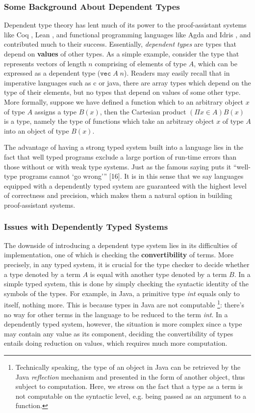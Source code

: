\documentclass{article}
\theoremstyle{remark}
\begin{document}
\subsubsection{Some Background About Dependent Types}
Dependent type theory has lent much of its power to the proof-assistant systems like Coq \cite{huet1997coq}, Lean \cite{de2015lean}, and functional programming languages like Agda \cite{norell2008dependently} and Idris \cite{brady2013idris}, and contributed much to their success. Essentially, \emph{dependent types} are types that depend on \textbf{values} of other types. As a simple example, consider the type that represents vectors of length $n$ comprising of elements of type $A$, which can be expressed as a dependent type ($\texttt{vec}\; A\; n$). Readers may easily recall that in imperative languages such as c or java, there are array types which depend on the type of their elements, but no types that depend on values of some other type. More formally, suppose we have defined a function which to an arbitrary object $x$ of type $A$ assigns a type $B(x)$, then the Cartesian product $(\Pi x \in A)B(x)$ is a type, namely the type of functions which take an arbitrary object $x$ of type $A$ into an object of type $B(x)$.

The advantage of having a strong typed system built into a language lies in the fact that well typed programs exclude a large portion of run-time errors than those without or with weak type systems. Just as the famous saying puts it “well-type programs cannot ‘go wrong’” [16]. It is in this sense that we say languages equipped with a dependently typed system are guaranteed with the highest level of correctness and precision, which makes them a natural option in building proof-assistant systems.

\subsubsection{Issues with Dependently Typed Systems}
The downside of introducing a dependent type system lies in its difficulties of implementation, one of which is checking the \textbf{convertibility} of terms. More precisely, in any typed system, it is crucial for the type checker to decide whether a type denoted by a term $A$ is equal with another type denoted by a term $B$. In a simple typed system, this is done by simply checking the syntactic identity of the symbols of the types. For example, in Java, a primitive type \emph{int} equals only to itself, nothing more. This is because types in Java are not computable \footnote{Technically speaking, the type of an object in Java can be retrieved by the Java \emph{reflection} mechanism and presented in the form of another object, thus subject to computation. Here, we stress on the fact that a type as a term is not computable on the syntactic level, e.g. being passed as an argument to a function.}: there's no way for other terms in the language to be reduced to the term \emph{int}. In a dependently typed system, however, the situation is more complex since a type may contain any value as its component, deciding the convertibility of types entails doing reduction on values, which requires much more computation.
\end{document}
